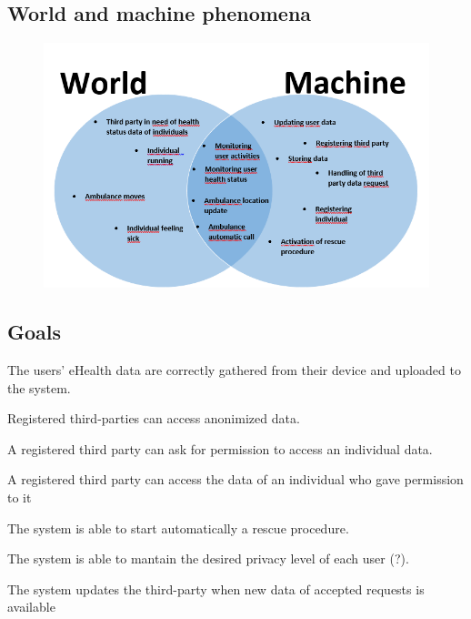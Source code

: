 \subsection{World and machine phenomena}
\begin{figure}
\centering
\includegraphics[scale=0.7]{img/phenomena.png}
\end{figure}


\subsection{Goals}

\begin{goal}
The users' eHealth data are correctly gathered from their device and uploaded to the system.
\end{goal}
\begin{goal}
Registered third-parties can access anonimized data.
\end{goal}
\begin{goal}
A registered third party can ask for permission to access an individual data.
\end{goal}
\begin{goal}
A registered third party can access the data of an individual who gave permission to it
\end{goal}
\begin{goal}
The system is able to start automatically a rescue procedure.
\end{goal}
\begin{goal}
The system is able to mantain the desired privacy level of each user (?).
\end{goal}
\begin{goal}
The system updates the third-party when new data of accepted requests is available
\end{goal}
